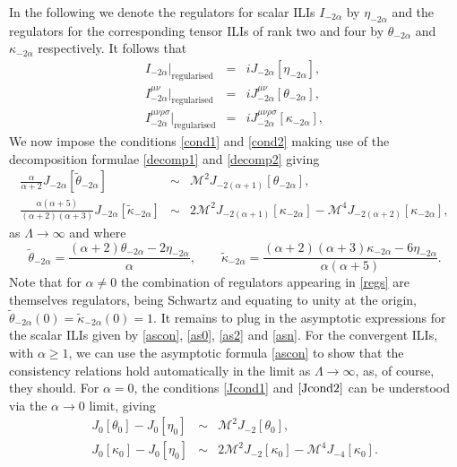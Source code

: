 \documentclass[11pt, letter]{article}
\def\be{\begin{equation}}
\def\ee{\end{equation}}
\newcommand{\M}{\mathcal{M}}
\begin{document}
In the following we denote the regulators for scalar ILIs $I_{-2\alpha}$ by  $\eta_{-2\alpha}$ and the regulators for the corresponding tensor ILIs of rank two and four by  $\theta_{-2\alpha}$ and $\kappa_{-2\alpha}$ respectively. It follows that 
\begin{eqnarray}
 I_{-2\alpha}|_\text{regularised} &=& i J_{-2\alpha}[\eta_{-2\alpha} ], \label{Jeta} \\
I^{\mu\nu}_{-2\alpha}|_\text{regularised} &=&  i J^{\mu\nu}_{-2\alpha} [\theta_{-2\alpha} ], \label{Jtheta} \\
I^{\mu\nu\rho \sigma}_{-2\alpha}|_\text{regularised} &=& iJ^{\mu\nu\rho \sigma}_{-2\alpha}[\kappa_{-2\alpha} ], \label{Jkappa}
\end{eqnarray}
We now impose the conditions \eqref{cond1} and \eqref{cond2} making use of the decomposition formulae \eqref{decomp1} and \eqref{decomp2} giving
\begin{eqnarray}
\frac{\alpha}{\alpha+2} J_{-2\alpha} \left[ \tilde \theta_{-2\alpha}\right]&\sim & \M^2 J_{-2(\alpha+1)}[\theta_{-2\alpha}] \label{Jcond1}, \\
\frac{\alpha(\alpha+5)}{(\alpha+2)(\alpha+3)} J_{-2\alpha} \left[ \tilde \kappa_{-2\alpha}\right]& \sim & 2\M^2 J_{-2(\alpha+1)}[\kappa_{-2\alpha}]-\M^4 J_{-2(\alpha+2)}[\kappa_{-2\alpha}],  \label{Jcond2}
\end{eqnarray}
as $\Lambda \to \infty$  and where 
\be
\tilde \theta_{-2\alpha}=\frac{(\alpha+2)\theta_{-2\alpha}-2 \eta_{-2\alpha}}{\alpha}, \qquad \tilde \kappa_{-2\alpha}=\frac{(\alpha+2)(\alpha+3)\kappa_{-2\alpha}-6 \eta_{-2\alpha}}{\alpha(\alpha+5)}. \label{regs}
\ee
Note that for $\alpha\neq 0$ the combination of regulators appearing in \eqref{regs}  are themselves regulators,  being Schwartz and equating to unity at the origin, $\tilde \theta_{-2\alpha}(0)=\tilde \kappa_{-2\alpha}(0)=1$. It remains to plug in the  asymptotic expressions for the scalar ILIs given by \eqref{ascon}, \eqref{as0}, \eqref{as2} and \eqref{asn}. For the convergent ILIs, with $\alpha \geq 1$,  we can use the asymptotic formula \eqref{ascon} to show that the consistency relations hold automatically in the limit as $\Lambda \to \infty$, as, of course, they should.  For $\alpha=0$,  the conditions \eqref{Jcond1} and $\eqref{Jcond2}$ can be understood via the $\alpha \to 0$ limit, giving
\begin{eqnarray}
J_{0} [ \theta_{0}]- J_{0} [ \eta_{0} ]&\sim & \M^2 J_{-2}[\theta_{0}], \label{Jcond1_}\\
J_{0} [ \kappa_{0}]- J_{0} [ \eta_{0} ] & \sim & 2\M^2 J_{-2}[\kappa_{0}]-\M^4 J_{-4}[\kappa_{0}].  \label{Jcond2_}
\end{eqnarray}
\end{document}
